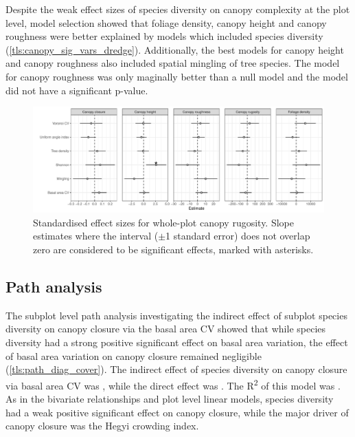 \begin{refsection}
Despite the weak effect sizes of species diversity on canopy complexity at the plot level, model selection showed that foliage density, canopy height and canopy roughness were better explained by models which included species diversity (\autoref{tls:canopy_sig_vars_dredge}). Additionally, the best models for canopy height and canopy roughness also included spatial mingling of tree species. The model for canopy roughness was only maginally better than a null model and the model did not have a significant p-value.

\begin{figure}
	\includegraphics[width=\linewidth]{img/canopy_rough_slopes}
	\caption[Plot canopy complexity metric fixed effects]{Standardised effect sizes for whole-plot canopy rugosity. Slope estimates where the interval ($\pm$1 standard error) does not overlap zero are considered to be significant effects, marked with asterisks.}
	\label{tls:canopy_rough_slopes}
\end{figure}

\begin{landscape}

\end{landscape}

\subsection{Path analysis}
\label{tls:ssec:path_analysis}

The subplot level path analysis investigating the indirect effect of subplot species diversity on canopy closure via the basal area CV showed that while species diversity had a strong positive significant effect on basal area variation, the effect of basal area variation on canopy closure remained negligible (\autoref{tls:path_diag_cover}). The indirect effect of species diversity on canopy closure via basal area CV was \shannonBaCoverPath{}, while the direct effect was \shannonCoverPath{}. The R\textsuperscript{2} of this model was \coverSemRm{}. As in the bivariate relationships and plot level linear models, species diversity had a weak positive significant effect on canopy closure, while the major driver of canopy closure was the Hegyi crowding index. 


\end{refsection}
